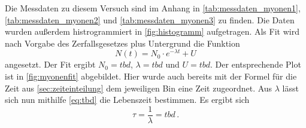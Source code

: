 Die Messdaten zu diesem Versuch sind im Anhang in \autoref{tab:messdaten_myonen1}, \autoref{tab:messdaten_myonen2} und \autoref{tab:messdaten_myonen3} zu finden.
Die Daten wurden außerdem histrogrammiert in \autoref{fig:histogramm} aufgetragen.
Als Fit wird nach Vorgabe des Zerfallsgesetzes plus Untergrund die Funktion
\begin{equation*}
    N(t) = N_0 \cdot e^{- \lambda t} + U
\end{equation*} 
angesetzt.
Der Fit ergibt $N_0 = tbd$, $\lambda = tbd$ und $U = tbd$.
Der entsprechende Plot ist in \autoref{fig:myonenfit} abgebildet.
Hier wurde auch bereits mit der Formel für die Zeit aus \autoref{sec:zeiteinteilung} dem jeweiligen Bin eine Zeit zugeordnet.
Aus $\lambda$ lässt sich nun mithilfe \autoref{eq:tbd} die Lebenszeit bestimmen.
Es ergibt sich
\begin{equation}
    \tau = \frac{1}{\lambda} = tbd \, .
\end{equation}